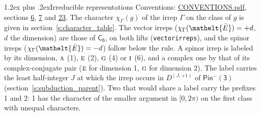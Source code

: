 \documentclass[10pt,a4paper]{article}
\makeatletter
\renewcommand\section{\@startsection{section}{1}{\z@}{-3ex plus -1ex minus -.2ex}%
  {1.2ex plus .2ex}{\normalfont\large\sffamily\bfseries\color{parttitle}}}
\numberwithin{equation}{section}
\newcommand{\eltfont}[1]{{\let\sigma\eltsigma\mathelt{#1}}}
\newcommand{\grp}[1]{\mathsf{#1}}
\newcommand{\irr}[1]{\text{\normalfont\scshape #1}}
\newcommand{\elt}[1]{\eltfont{#1}}
\newcommand{\irrJp}[2]{D^{(#1,#2)}}
\newcommand{\irchar}[1]{\chi_{#1}}
\newcommand{\barred}[1]{\bar{#1}}
\makeatother
\begin{document}
\section{Irreducible representations}\label{s:irreps}
Conventions: \href{../../CONVENTIONS.pdf}{CONVENTIONS.pdf}, sections \href{../../../rotation/CONVENTIONS.pdf\#conv.6}{6}, \href{../../../rotation/CONVENTIONS.pdf\#conv.7}{7} and \href{../../CONVENTIONS.pdf\#conv.23}{23}.
\leavevmode\label{n:function.character}\label{n:irrep.Gamma}The character $\irchar{\Gamma}(g)$ of the irrep $\Gamma$ on the class of $g$ is given in section~\ref{s:character_table}. \label{n:index.dimension}The vector irreps ($\irchar{\Gamma}(\elt{\barred{E}}) = +d$, $d$ the dimension) are those of \href{../../../rotation/data/pdf/C6.pdf}{$\grp{C_{6}}$}, on both lifts (\texttt{vectorirreps}), and the spinor irreps ($\irchar{\Gamma}(\elt{\barred{E}}) = -d$) follow below the rule. A spinor irrep is labeled by its dimension, $\irr{a}$ (1), $\irr{e}$ (2), $\irr{g}$ (4) or $\irr{i}$ (6), and a complex one by that of its complex-conjugate pair ($\irr{e}$ for dimension 1, $\irr{g}$ for dimension 2). The label carries the least half-integer $J$ at which the irrep occurs in $\irrJp{J}{+1}$ of $\grp{Pin^{-}(3)}$ (section~\ref{s:subduction_parent}). Two that would share a label carry the prefixes 1 and 2: 1 has the character of the smaller argument in $[0, 2\pi)$ on the first class with unequal characters.
\end{document}
